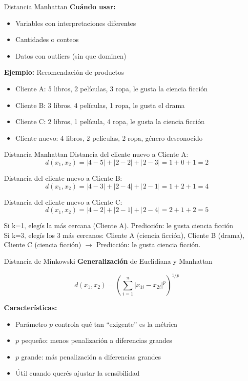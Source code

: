 \documentclass{beamer}
\begin{document}
\begin{frame}{Distancia Manhattan}
    \textbf{Cuándo usar:}
    \begin{itemize}
        \item Variables con interpretaciones diferentes
        \item Cantidades o conteos
        \item Datos con outliers (sin que dominen)
    \end{itemize}
    
    \vspace{0.3cm}
    
    \textbf{Ejemplo:} Recomendación de productos
    \begin{itemize}
        \item Cliente A: 5 libros, 2 películas, 3 ropa, le gusta la ciencia ficción
        \item Cliente B: 3 libros, 4 películas, 1 ropa, le gusta el drama  
        \item Cliente C: 2 libros, 1 película, 4 ropa, le gusta la ciencia ficción
        \item Cliente nuevo: 4 libros, 2 películas, 2 ropa, género desconocido
    \end{itemize}
\end{frame}

\begin{frame}{Distancia Manhattan}
    Distancia del cliente nuevo a Cliente A: 
    \[d(x_1, x_2) = |4-5| + |2-2| + |2-3| = 1 + 0 + 1 = 2\]

    Distancia del cliente nuevo a Cliente B: 
    \[d(x_1, x_2) = |4-3| + |2-4| + |2-1| = 1 + 2 + 1 = 4\]

    Distancia del cliente nuevo a Cliente C: 
    \[d(x_1, x_2) = |4-2| + |2-1| + |2-4| = 2 + 1 + 2 = 5\]

    Si k=1, elegís la más cercana (Cliente A). Predicción: le gusta ciencia ficción \\
    Si k=3, elegís los 3 más cercanos: Cliente A (ciencia ficción), Cliente B (drama), Cliente C (ciencia ficción) $\rightarrow$ Predicción: le gusta ciencia ficción.
\end{frame}

\begin{frame}{Distancia de Minkowski}
    \textbf{Generalización} de Euclidiana y Manhattan
    
    \[d(x_1, x_2) = \left(\sum_{i=1}^{n} |x_{1i} - x_{2i}|^p\right)^{1/p}\]
    
    \vspace{0.3cm}
    
    \textbf{Características:}
    \begin{itemize}
        \item Parámetro $p$ controla qué tan ``exigente'' es la métrica
        \item $p$ pequeño: menos penalización a diferencias grandes
        \item $p$ grande: más penalización a diferencias grandes
        \item Útil cuando querés ajustar la sensibilidad
    \end{itemize}
\end{frame}
\end{document}
